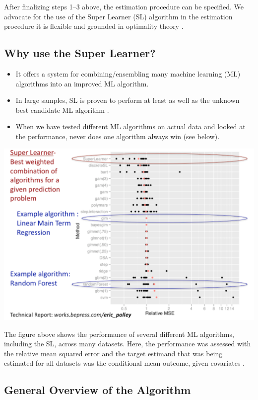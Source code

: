 \documentclass[
  12pt, krantz2,
]{book}
\providecommand{\tightlist}{%
  \setlength{\itemsep}{0pt}\setlength{\parskip}{0pt}}
\theoremstyle{definition}
\theoremstyle{definition}
\theoremstyle{definition}
\newcommand{\1}{\mathbbm{1}}
\begin{document}
After finalizing steps 1--3 above, the estimation procedure can be specified.
We advocate for the use of the Super Learner (SL) algorithm in the estimation
procedure it is flexible and grounded in optimality theory \citep{vdl2007super}.

\hypertarget{why-use-the-super-learner}{%
\subsection*{Why use the Super Learner?}\label{why-use-the-super-learner}}


\begin{itemize}
\tightlist
\item
  It offers a system for combining/ensembling many machine learning (ML)
  algorithms into an improved ML algorithm.
\item
  In large samples, SL is proven to perform at least as well as the unknown
  best candidate ML algorithm \citep{vdl2003unified, vaart2006oracle}.
\item
  When we have tested different ML algorithms on actual data and looked at the
  performance, never does one algorithm always win (see below).
\end{itemize}

\begin{center}\includegraphics[width=0.8\linewidth]{img/png/ericSL} \end{center}

The figure above shows the performance of several different ML algorithms,
including the SL, across many datasets. Here, the performance was assessed with
the relative mean squared error and the target estimand that was being estimated
for all datasets was the conditional mean outcome, given covariates
\citep{polley2010super}.

\hypertarget{general-overview-of-the-algorithm}{%
\subsection{General Overview of the Algorithm}\label{general-overview-of-the-algorithm}}
\end{document}
